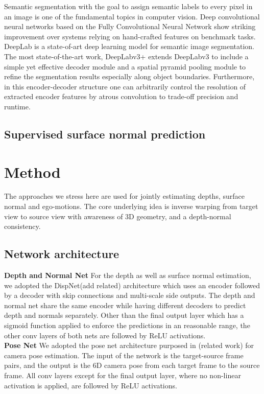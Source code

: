 \documentclass[10pt,twocolumn,letterpaper]{article}
\begin{document}
Semantic segmentation with the goal to assign semantic labels to every pixel in an image is one of the fundamental topics in computer vision. Deep convolutional neural networks based on the Fully Convolutional Neural Network show striking improvement over systems relying on hand-crafted features on benchmark tasks. DeepLab is a state-of-art deep learning model for semantic image segmentation. The most state-of-the-art work, DeepLabv3+\cite{deeplabv3plus2018} extends DeepLabv3\cite{chen2017rethinking} to include a simple yet effective decoder module and a spatial pyramid pooling module to refine the segmentation results especially along object boundaries. Furthermore, in this encoder-decoder structure one can arbitrarily control the resolution of extracted encoder features by atrous convolution to trade-off precision and runtime.
\subsection{Supervised surface normal prediction}


\section{Method}
The approaches we stress here are used for jointly estimating depths, surface normal and ego-motions. The core underlying idea is inverse warping from target view to source view with awareness of 3D geometry, and a depth-normal consistency. 
\subsection{Network architecture}
\textbf{Depth and Normal Net}
For the depth as well as surface normal estimation, we adopted the DispNet(add related) architecture which uses an encoder followed by a decoder with skip connections and multi-scale side outputs. The depth and normal net share the same encoder while having different decoders to predict depth and normals separately. Other than the final output layer which has a sigmoid function applied to enforce the predictions in an reasonable range, the other conv layers of both nets are followed by ReLU activations.\\  
\textbf{Pose Net}
We adopted the pose net architecture purposed in (related work) for camera pose estimation. The input of the network is the target-source frame pairs, and the output is the 6D camera pose from each target frame to the source frame. All conv layers except for the final output layer, where no non-linear activation is applied, are followed by ReLU activations.
\end{document}

